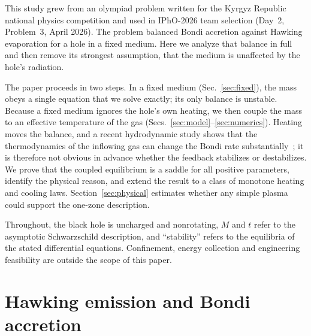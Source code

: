 \documentclass[11pt,a4paper]{article}
\begin{document}
This study grew from an olympiad problem written for the Kyrgyz Republic national physics competition and used in IPhO-2026 team selection (Day~2, Problem~3, April 2026). The problem balanced Bondi accretion against Hawking evaporation for a hole in a fixed medium. Here we analyze that balance in full and then remove its strongest assumption, that the medium is unaffected by the hole's radiation.

The paper proceeds in two steps. In a fixed medium (Sec.~\ref{sec:fixed}), the mass obeys a single equation that we solve exactly; its only balance is unstable. Because a fixed medium ignores the hole's own heating, we then couple the mass to an effective temperature of the gas (Secs.~\ref{sec:model}--\ref{sec:numerics}). Heating moves the balance, and a recent hydrodynamic study shows that the thermodynamics of the inflowing gas can change the Bondi rate substantially~\cite{cantiello}; it is therefore not obvious in advance whether the feedback stabilizes or destabilizes. We prove that the coupled equilibrium is a saddle for all positive parameters, identify the physical reason, and extend the result to a class of monotone heating and cooling laws. Section~\ref{sec:physical} estimates whether any simple plasma could support the one-zone description.

Throughout, the black hole is uncharged and nonrotating, $M$ and $t$ refer to the asymptotic Schwarzschild description, and ``stability'' refers to the equilibria of the stated differential equations. Confinement, energy collection and engineering feasibility are outside the scope of this paper.

\section{Hawking emission and Bondi accretion}\label{sec:ingredients}
\end{document}
